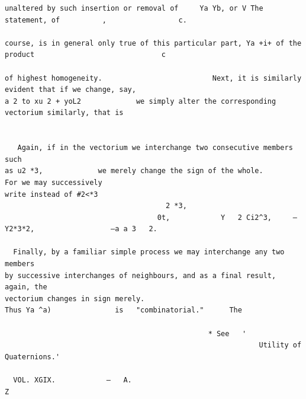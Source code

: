\documentclass[10pt]{article}
\begin{document}
\begin{verbatim}
unaltered by such insertion or removal of     Ya Yb, or V The statement, of          ,                 c.

course, is in general only true of this particular part, Ya +i+ of the product                              c

of highest homogeneity.                          Next, it is similarly evident that if we change, say,
a 2 to xu 2 + yoL2             we simply alter the corresponding vectorium similarly, that is


   Again, if in the vectorium we interchange two consecutive members such
as u2 *3,             we merely change the sign of the whole.                                  For we may successively
write instead of #2<*3
                                      2 *3,
                                    0t,            Y   2 Ci2^3,     —Y2*3*2,                  —a a 3   2.

  Finally, by a familiar simple process we may interchange any two members
by successive interchanges of neighbours, and as a final result, again, the
vectorium changes in sign merely.                                   Thus Ya ^a)               is   "combinatorial."      The

                                                * See   '
                                                            Utility of Quaternions.'

  VOL. XGIX.            —   A.                                                                                     Z


\end{verbatim}
\clearpage
\end{document}
